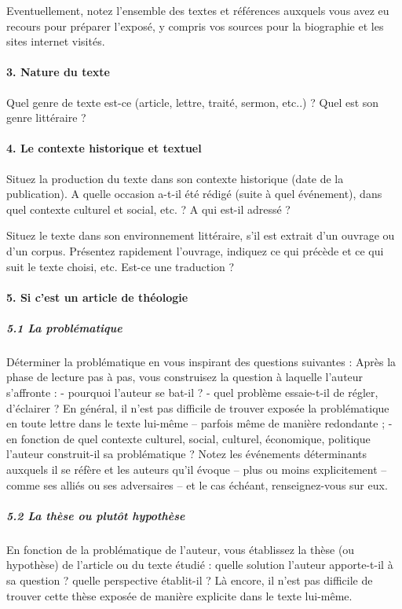 Eventuellement, notez l’ensemble des textes et références auxquels vous avez eu recours pour préparer l’exposé, y compris vos sources pour la biographie et les sites internet visités. 

\paragraph{3.	Nature du texte}

Quel genre de texte est-ce (article, lettre, traité, sermon, etc..) ? Quel est son genre littéraire ?

\paragraph{4.	Le contexte historique et textuel}

Situez la production du texte dans son contexte historique (date de la publication). A quelle occasion a-t-il été rédigé (suite à quel événement), dans quel contexte culturel et social, etc. ? A qui est-il adressé ?

Situez le texte dans son environnement littéraire, s’il est extrait d’un ouvrage ou d’un corpus. Présentez rapidement l’ouvrage, indiquez ce qui précède et ce qui suit le texte choisi, etc. Est-ce une traduction ?

\paragraph{5.	Si c’est un article de théologie}


	\subparagraph{5.1 La problématique }

Déterminer la problématique en vous inspirant des questions suivantes :
Après la phase de lecture pas à pas, vous construisez la question à laquelle l’auteur s’affronte :
-	pourquoi l’auteur se bat-il ?
-	quel problème essaie-t-il de régler, d’éclairer ? En général, il n’est pas difficile de trouver exposée la problématique en toute lettre dans le texte lui-même – parfois même de manière redondante ;
-	en fonction de quel contexte culturel, social, culturel, économique, politique l’auteur construit-il sa problématique ? Notez les événements déterminants auxquels il se réfère et les auteurs qu’il évoque – plus ou moins explicitement – comme ses alliés ou ses adversaires – et le cas échéant, renseignez-vous sur eux. 

\subparagraph{5.2	 La thèse ou plutôt hypothèse}

En fonction de la problématique de l’auteur, vous établissez la thèse (ou hypothèse) de l’article ou du texte étudié : quelle solution l’auteur apporte-t-il à sa question ? quelle perspective établit-il ? Là encore, il n’est pas difficile de trouver cette thèse exposée de manière explicite dans le texte lui-même. 

